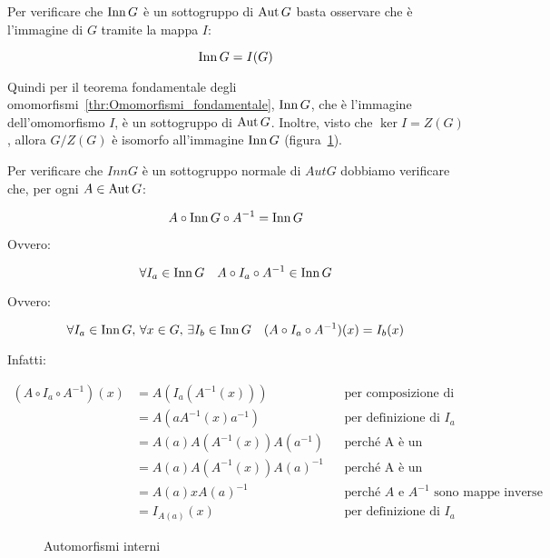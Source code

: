 \begin{soluzione}
	Per verificare che $\operatorname{Inn} G$ è un sottogruppo di $\operatorname{Aut} G$ basta osservare che è l'immagine di $G$ tramite la mappa $I$:
	
	\begin{equation}
		\operatorname{Inn} G = I(G)
	\end{equation}

	Quindi per il teorema fondamentale degli omomorfismi~\ref{thr:Omomorfismi_fondamentale}, $\operatorname{Inn} G$, che è l'immagine dell'omomorfismo $I$, è un sottogruppo di $\operatorname{Aut} G$. Inoltre, visto che $\ker I = Z(G)$, allora $G/Z(G)$ è isomorfo all'immagine $\operatorname{Inn} G$ (figura~\ref{fig:automorfismi_interni}).
	
	
	Per verificare che $Inn G$ è un sottogruppo normale di $Aut G$ dobbiamo verificare che, per ogni $A \in \operatorname{Aut} G$:
	
	\begin{equation}
		A \circ \operatorname{Inn} G \circ A^{-1} = \operatorname{Inn} G
	\end{equation}

	Ovvero:
	
	\begin{equation}
		\forall I_a \in \operatorname{Inn} G \quad A \circ I_a \circ A^{-1} \in \operatorname{Inn} G
	\end{equation}
	
	Ovvero:
	
	\begin{equation}
		\forall I_a \in \operatorname{Inn} G,\, \forall x \in G,\, \exists I_b \in \operatorname{Inn} G \quad (A \circ I_a \circ A^{-1})(x) = I_b(x)
	\end{equation}

	Infatti:
	
	\begin{align}
		(A \circ I_a \circ A^{-1})(x) &= A(I_a(A^{-1}(x))) &&\text{per composizione di automorfismi} \\
		&= A(a A^{-1}(x) a^{-1}) && \text{per definizione di $I_a$} \\
		&= A(a) A(A^{-1}(x))A(a^{-1}) && \text{perché A è un automorfismo} \\
		&= A(a) A(A^{-1}(x))A(a)^{-1} && \text{perché A è un automorfismo} \\
		&= A(a) x A(a)^{-1} && \text{perché $A$ e $A^{-1}$ sono mappe inverse} \\
		&= I_{A(a)}(x) && \text{per definizione di $I_a$}
	\end{align}
	
\end{soluzione}

\begin{figure}[tp]
	\centering
	\caption{Automorfismi interni}
	\label{fig:automorfismi_interni}
\end{figure}

